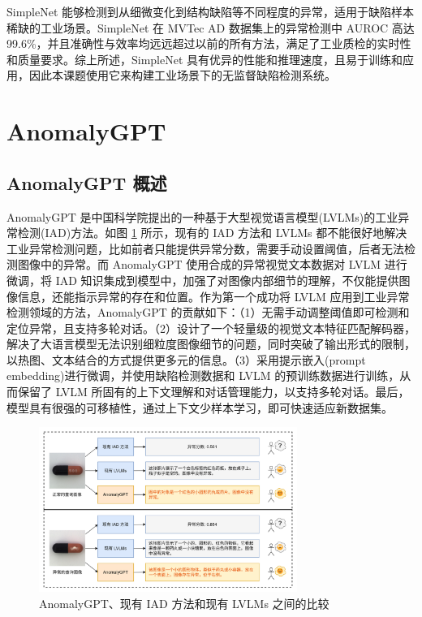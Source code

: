 \documentclass[
  ]{njuthesis}
\begin{document}
SimpleNet 能够检测到从细微变化到结构缺陷等不同程度的异常，适用于缺陷样本稀缺的工业场景。SimpleNet 在 MVTec AD 数据集上的异常检测中 AUROC 高达 99.6\%，并且准确性与效率均远远超过以前的所有方法，满足了工业质检的实时性和质量要求。综上所述，SimpleNet 具有优异的性能和推理速度，且易于训练和应用，因此本课题使用它来构建工业场景下的无监督缺陷检测系统。

\section{AnomalyGPT}

\subsection{AnomalyGPT 概述}

AnomalyGPT\cite{[14]} 是中国科学院提出的一种基于大型视觉语言模型(LVLMs)的工业异常检测(IAD)方法。如图 \ref{AnomalyGPT比较图} 所示，现有的 IAD 方法和 LVLMs 都不能很好地解决工业异常检测问题，比如前者只能提供异常分数，需要手动设置阈值，后者无法检测图像中的异常。而 AnomalyGPT 使用合成的异常视觉文本数据对 LVLM 进行微调，将 IAD 知识集成到模型中，加强了对图像内部细节的理解，不仅能提供图像信息，还能指示异常的存在和位置。作为第一个成功将 LVLM 应用到工业异常检测领域的方法，AnomalyGPT 的贡献如下：（1）无需手动调整阈值即可检测和定位异常，且支持多轮对话。（2）设计了一个轻量级的视觉文本特征匹配解码器，解决了大语言模型无法识别细粒度图像细节的问题，同时突破了输出形式的限制，以热图、文本结合的方式提供更多元的信息。（3）采用提示嵌入(prompt embedding)进行微调，并使用缺陷检测数据和 LVLM 的预训练数据进行训练，从而保留了 LVLM 所固有的上下文理解和对话管理能力，以支持多轮对话。最后，模型具有很强的可移植性，通过上下文少样本学习，即可快速适应新数据集。

\begin{figure}[ht]
    \centering
    \includegraphics[width=0.75\textwidth]{images/AnomalyGPT演示.png}
    \caption{AnomalyGPT、现有 IAD 方法和现有 LVLMs 之间的比较}
    \label{AnomalyGPT比较图}
\end{figure}
\end{document}

